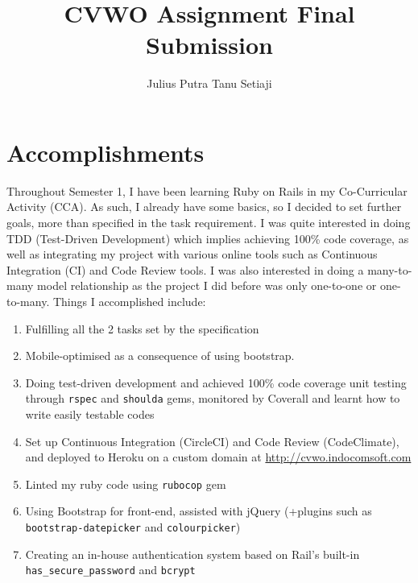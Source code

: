 \documentclass[12pt, a4paper]{article}
\title{CVWO Assignment Final Submission}
\author{Julius Putra Tanu Setiaji}
\begin{document}
	\maketitle
	\section{Accomplishments}
		Throughout Semester 1, I have been learning Ruby on Rails in my Co-Curricular Activity (CCA). As such, I already have some basics, so I decided to set further goals, more than specified in the task requirement. I was quite interested in doing TDD (Test-Driven Development) which implies achieving 100\% code coverage, as well as integrating my project with various online tools such as Continuous Integration (CI) and Code Review tools. I was also interested in doing a many-to-many model relationship as the project I did before was only one-to-one or one-to-many. Things I accomplished include:
		\begin{enumerate}
			\item Fulfilling all the 2 tasks set by the specification
			\item Mobile-optimised as a consequence of using bootstrap.
			\item Doing test-driven development and achieved 100\% code coverage unit testing through \texttt{rspec} and \texttt{shoulda} gems, monitored by Coverall and learnt how to write easily testable codes
			\item Set up Continuous Integration (CircleCI) and Code Review (CodeClimate), and deployed to Heroku on a custom domain at \url{http://cvwo.indocomsoft.com}
			\item Linted my ruby code using \texttt{rubocop} gem
			\item Using Bootstrap for front-end, assisted with jQuery (+plugins such as \texttt{bootstrap-datepicker} and \texttt{colourpicker})
			\item Creating an in-house authentication system based on Rail's built-in \texttt{has\_secure\_password} and \texttt{bcrypt}
		\end{enumerate}
\end{document}
